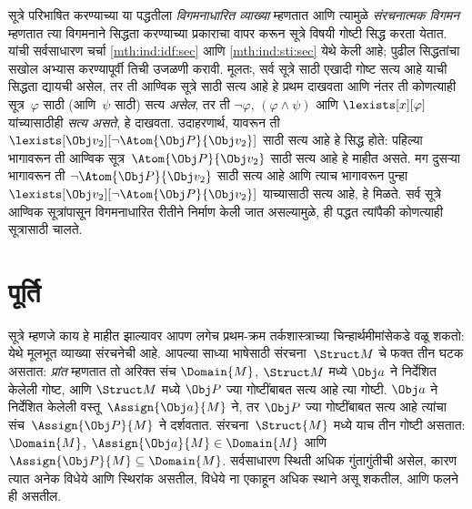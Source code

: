 सूत्रे परिभाषित करण्याच्या या पद्धतीला \emph{विगमनाधारित
व्याख्या} म्हणतात आणि त्यामुळे \emph{संरचनात्मक विगमन} म्हणतात त्या
विगमनाने सिद्धता करण्याच्या प्रकाराचा वापर करून सूत्रे विषयी
गोष्टी सिद्ध करता येतात. यांची सर्वसाधारण चर्चा
\ref{mth:ind:idf:sec} आणि \ref{mth:ind:sti:sec} येथे केली
आहे; पुढील सिद्धतांचा सखोल अभ्यास करण्यापूर्वी तिची उजळणी करावी. मूलतः,
सर्व सूत्रे साठी एखादी गोष्ट सत्य आहे याची सिद्धता द्यायची असेल,
तर ती आण्विक सूत्रे साठी सत्य आहे हे प्रथम दाखवता आणि नंतर ती
कोणत्याही सूत्र~$\varphi$ साठी (आणि~$\psi$ साठी) सत्य \emph{असेल}, तर
ती $\lnot \varphi$, $(\varphi \land \psi)$ आणि $\lexists[x][\varphi]$ यांच्यासाठीही
\emph{सत्य असते}, हे दाखवता. उदाहरणार्थ, यावरून ती
$\lexists[\Obj v_2][\lnot \Atom{\Obj P}{\Obj v_2}]$ साठी सत्य आहे हे
सिद्ध होते: पहिल्या भागावरून ती आण्विक सूत्र~$\Atom{\Obj
P}{\Obj v_2}$ साठी सत्य आहे हे माहीत असते. मग दुसऱ्या भागावरून ती
$\lnot \Atom{\Obj P}{\Obj v_2}$ साठी सत्य आहे आणि त्याच भागावरून पुन्हा
$\lexists[\Obj v_2][\lnot \Atom{\Obj P}{\Obj v_2}]$ याच्यासाठी सत्य
आहे, हे मिळते. सर्व सूत्रे आण्विक सूत्रांपासून
विगमनाधारित रीतीने निर्माण केली जात असल्यामुळे, ही पद्धत त्यांपैकी
कोणत्याही सूत्रासाठी चालते.












\section{पूर्ति}\label{fol:int:sat:sec}

सूत्रे म्हणजे काय हे माहीत झाल्यावर आपण लगेच प्रथम-क्रम
तर्कशास्त्राच्या चिन्हार्थमीमांसेकडे वळू शकतो: येथे मूलभूत व्याख्या
संरचनेची आहे. आपल्या साध्या भाषेसाठी संरचना~$\Struct M$
चे फक्त तीन घटक असतात: \emph{प्रांत} म्हणतात तो अरिक्त संच
$\Domain{M}$, $\Struct M$ मध्ये $\Obj a$ ने निर्देशित केलेली गोष्ट, आणि
$\Struct M$ मध्ये $\Obj P$ ज्या गोष्टींबाबत सत्य आहे त्या गोष्टी.
$\Obj a$ ने निर्देशित केलेली वस्तू~$\Assign{\Obj a}{M}$ ने, तर
$\Obj P$ ज्या गोष्टींबाबत सत्य आहे त्यांचा संच~$\Assign{\Obj P}{M}$ ने
दर्शवतात. संरचना~$\Struct{M}$ मध्ये याच तीन गोष्टी असतात:
$\Domain{M}$, $\Assign{\Obj a}{M} \in \Domain{M}$ आणि
$\Assign{\Obj P}{M} \subseteq \Domain{M}$. सर्वसाधारण स्थिती अधिक
गुंतागुंतीची असेल, कारण त्यात अनेक विधेये आणि स्थिरांक
असतील, विधेये ना एकाहून अधिक स्थाने असू शकतील, आणि
फलने ही असतील.


